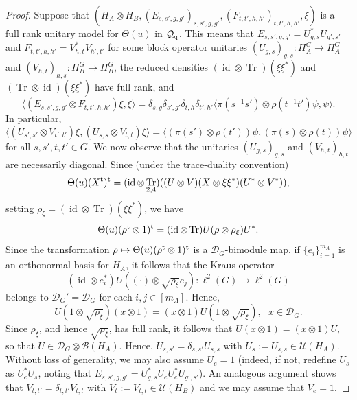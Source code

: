 \documentclass[11pt]{amsart}
\theoremstyle{definition}
\DeclareMathOperator{\id}{id}
\DeclareMathOperator{\tr}{Tr}
\newcommand{\cl}[1]{\mathcal{#1}}
\newcommand{\la}{\langle}
\newcommand{\ra}{\rangle}
\newcommand{\ten}{\otimes}
\begin{document}
\begin{proof}
Suppose that
$(H_A\ten H_B,(E_{s,s',g,g'})_{s,s',g,g'},(F_{t,t',h,h'})_{t,t',h,h'},\xi)$ is a full rank unitary model for $\Theta(u)$ in $\cl {Q}_{\rm q}$. This means that $E_{s,s',g,g'} = U_{g,s}^*U_{g',s'}$ and $F_{t,t',h,h'}=V_{h,t}^*V_{h',t'}$ for some block operator unitaries $(U_{g,s})_{g,s} :H_A^G\to H_A^G$ and 
$(V_{h,t})_{h,s} : H_B^G\to H_B^G$, the reduced densities 
$(\id\ten\tr)(\xi\xi^*)$ and $(\tr\ten\id)(\xi\xi^*)$ have full rank, and 
$$\la (E_{s,s',g,g'}\ten F_{t,t',h,h'}) \xi,\xi\ra=\delta_{s,g}\delta_{s',g'}\delta_{t,h}\delta_{t',h'}\la\pi(s^{-1}s')\ten\rho(t^{-1}t')\psi,\psi\ra.$$
In particular,
\begin{equation}\label{e:1}
\la (U_{s',s'}\ten V_{t',t'})\xi,
(U_{s,s}\ten V_{t,t}) \xi\ra = \la (\pi(s')\ten\rho(t'))\psi, (\pi(s)\ten\rho(t))\psi\ra
\end{equation}
for all $s,s',t,t'\in G$.
We now observe that the unitaries $(U_{g,s})_{g,s}$ and 
$(V_{h,t})_{h,t}$ are necessarily diagonal. 
Since (under the trace-duality convention)
$$\Theta(u)(X^{\rm t})^{\rm t} = (\id\ten\tr_{2,4})((U\ten V)(X\ten\xi\xi^*)(U^*\ten V^*)),$$ 
setting $\rho_\xi = (\id\ten\tr)(\xi\xi^*)$, we have 
$$\Theta(u)(\rho^{\rm t}\ten 1)^{\rm t} = 
(\id\ten \tr)U(\rho\ten\rho_{\xi})U^*.$$ 
Since the transformation 
$\rho \mapsto \Theta(u)(\rho^{\rm t}\ten 1)^{\rm t}$ 
is a $\cl{D}_G$-bimodule map, if 
$\{e_i\}_{i=1}^{m_A}$ is an orthonormal basis for $H_A$, 
it follows that the Kraus operator
$$(\id\ten e_i^*)U((\cdot)\ten\sqrt{\rho_{\xi}}e_j):\ell^2(G)\to\ell^2(G)$$
belongs to $\cl{D}_G'=\cl{D}_G$ for each $i,j \in [m_A]$. Hence,
$$U(1\ten\sqrt{\rho_{\xi}})(x\ten 1)=(x\ten 1)U(1\ten\sqrt{\rho_{\xi}}), \ \ \ x\in \cl{D}_G.$$
Since $\rho_{\xi}$, and hence $\sqrt{\rho_{\xi}}$, has full rank, it follows that $U(x\ten 1)=(x\ten 1)U$, so that $U\in\cl {D}_G\ten\cl B(H_A)$. Hence, $U_{s,s'}=\delta_{s,s'}U_{s,s}$ with $U_s:=U_{s,s}\in\cl U(H_A)$. 
Without loss of generality, we may also assume $U_e = 1$ (indeed, if not,
redefine $U_s$ as $U_e^*U_s$, noting that $E_{s,s',g,g'}=U_{g,s}^*U_{e}U_{e}^*U_{g',s'}$).
An analogous argument shows that $V_{t,t'}=\delta_{t,t'}V_{t,t}$ with $V_t:=V_{t,t}\in\cl U(H_B)$ and we may assume that $V_e=1$. 


\end{proof}
\end{document}
